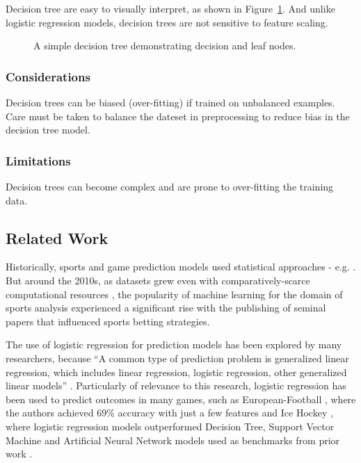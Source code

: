 \documentclass[12pt]{article}
\begin{document}
Decision tree are easy to visually interpret, as shown in Figure~\ref{fig:decision-tree}. And unlike logistic regression models, decision trees are not sensitive to feature scaling.

\begin{figure}[H]
\centering
{}
\caption{A simple decision tree demonstrating decision and leaf nodes.}
\label{fig:decision-tree}
\end{figure}

\subsubsection{Considerations}Decision trees can be biased (over-fitting) if trained on unbalanced examples. Care must be taken to balance the dateset in preprocessing to reduce bias in the decision tree model.

\subsubsection{Limitations}Decision trees can become complex and are prone to over-fitting the training data.

\subsection{Related Work}
Historically, sports and game prediction models used statistical approaches - e.g. \cite{Clarke1995} \cite{Bailey2006}. But around the 2010s, as datasets grew even with comparatively-scarce computational resources \cite{Bottou2003}, the popularity of machine learning for the domain of sports analysis experienced a significant rise \cite{aiSports} with the publishing of seminal papers \cite{Constantinou2012} that influenced sports betting strategies.

The use of logistic regression for prediction models has been explored by many researchers, because ``A common type of prediction problem is generalized linear regression, which includes linear regression, logistic regression, other generalized linear models'' \cite{Gordon1999}. Particularly of relevance to this research, logistic regression has been used to predict outcomes in many games, such as European-Football \cite{Prasetio2016}, where the authors achieved 69\% accuracy with just a few features and Ice Hockey \cite{Chin2023}, where logistic regression models outperformed Decision Tree, Support Vector Machine and Artificial Neural Network models used as benchmarks from prior work \cite{Pischedda2014} \cite{Igiri2014}.
\end{document}

